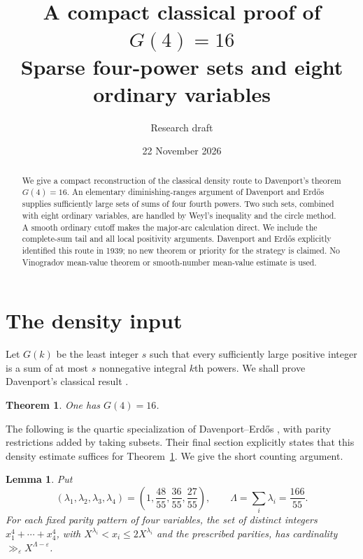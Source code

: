 \documentclass[11pt]{article}
\title{A compact classical proof of \(G(4)=16\)\\
\large Sparse four-power sets and eight ordinary variables}
\author{Research draft}
\date{22 November 2026}
\newtheorem{theorem}{Theorem}
\newtheorem{lemma}{Lemma}
\theoremstyle{remark}\newtheorem*{remark}{Remark}
\newcommand{\eps}{\varepsilon}
\begin{document}
\maketitle
\begin{abstract}
We give a compact reconstruction of the classical density route to
Davenport's theorem \(G(4)=16\). An elementary diminishing-ranges argument
of Davenport and Erd\H os supplies sufficiently large sets of sums of four
fourth powers. Two such sets, combined with eight ordinary variables, are
handled by Weyl's inequality and the circle method. A smooth ordinary
cutoff makes the major-arc calculation direct. We include the complete-sum
tail and all local positivity arguments. Davenport and Erd\H os explicitly
identified this route in 1939; no new theorem or priority for the strategy
is claimed. No Vinogradov mean-value theorem or smooth-number mean-value
estimate is used.
\end{abstract}

\section{The density input}

Let \(G(k)\) be the least integer \(s\) such that every sufficiently large
positive integer is a sum of at most \(s\) nonnegative integral \(k\)th powers.
We shall prove Davenport's classical result \cite{Davenport}.
\begin{theorem}\label{thm:main}
One has \(G(4)=16\).
\end{theorem}

The following is the quartic specialization of Davenport--Erd\H os
\cite[Theorem~1]{DE}, with parity restrictions added by taking subsets.
Their final section explicitly states that this density estimate suffices
for Theorem~\ref{thm:main}. We give the short counting argument.

\begin{lemma}\label{lem:density}
Put
\[
 (\lambda_1,\lambda_2,\lambda_3,\lambda_4)
 =\left(1,\frac{48}{55},\frac{36}{55},\frac{27}{55}\right),
 \qquad \Lambda=\sum_i\lambda_i=\frac{166}{55}.
\]
For each fixed parity pattern of four variables, the set of distinct integers
\(x_1^4+\cdots+x_4^4\), with
\(X^{\lambda_i}<x_i\le2X^{\lambda_i}\) and the prescribed parities,
has cardinality \(\gg_\eps X^{\Lambda-\eps}\).
\end{lemma}
\end{document}
